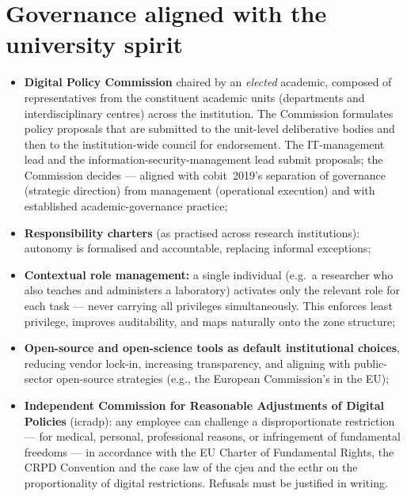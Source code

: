 
\section{Governance aligned with the university spirit}

\begin{itemize}
  \item \textbf{Digital Policy Commission} chaired by an \emph{elected}
    academic, composed of representatives from the constituent academic
    units (departments and interdisciplinary centres) across the
    institution. The Commission formulates policy proposals that are
    submitted to the unit-level deliberative bodies and then to the
    institution-wide council for endorsement. The IT-management lead
    and the information-security-management lead submit proposals; the
    Commission decides --- aligned with \gls{cobit}~2019's separation of governance
    (strategic direction) from management (operational execution)
    and with established academic-governance practice;
  \item \textbf{Responsibility charters} (as practised across research
    institutions): autonomy
    is formalised and accountable, replacing informal exceptions;
  \item \textbf{Contextual role management:} a single individual
    (e.g.\ a researcher who also teaches and administers a laboratory)
    activates only the relevant role for each task --- never carrying all
    privileges simultaneously. This enforces least privilege, improves
    auditability, and maps naturally onto the zone structure;
  \item \textbf{Open-source and open-science tools as default
    institutional choices}, reducing vendor lock-in, increasing
    transparency, and aligning with public-sector open-source
    strategies (e.g., the European Commission's in the EU);
  \item \textbf{Independent Commission for Reasonable Adjustments
    of Digital Policies} (\gls{icradp}): any employee can
    challenge a disproportionate restriction --- for medical, personal,
    professional reasons, or infringement of fundamental freedoms ---
    in accordance with the EU Charter of Fundamental Rights, the
    CRPD Convention and the case law of the \gls{cjeu} and the \gls{ecthr}
    on the proportionality of digital restrictions.  Refusals must be justified in writing.
\end{itemize}

